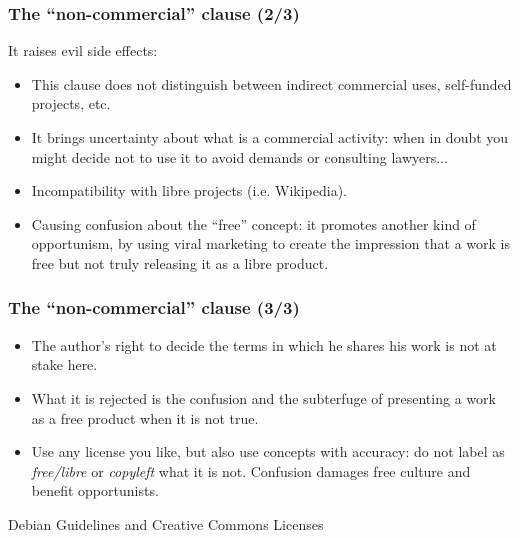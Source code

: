 
\begin{frame}
\frametitle{The ``non-commercial'' clause (2/3)}

It raises evil side effects: 
\begin{itemize}
\item This clause does not distinguish between indirect commercial uses, self-funded projects, etc.
\item It brings uncertainty about what is a commercial activity: when in doubt you might decide not to use it to avoid demands or consulting lawyers... 
\item Incompatibility with libre projects (i.e. Wikipedia).
\item Causing confusion about  the ``free'' concept: it promotes another kind of opportunism, by using viral marketing to create the impression that a work is free but not truly releasing it as a libre product.
\end{itemize}                                                 

\end{frame}


\begin{frame}
\frametitle{The ``non-commercial'' clause (3/3)}

\begin{itemize}
\item The author's right to decide the terms in which he shares his work is not at stake here.
\item What it is rejected is the confusion and the subterfuge of presenting a work as a free product when it is not true.
\item Use any license you like, but also use concepts with accuracy: do not label as \textit{free/libre} or \textit{copyleft} what it is not. Confusion damages free culture and benefit opportunists.
\end{itemize}
\end{frame}



\begin{frame}
\begin{center}
\huge{Debian Guidelines and Creative Commons Licenses}
\end{center}

\end{frame}


